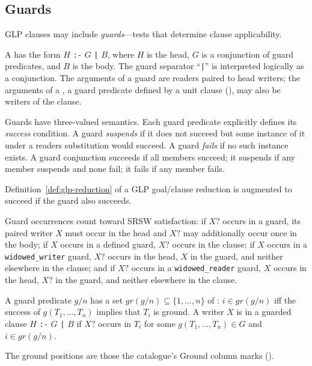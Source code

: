 \subsection{Guards}
\label{sec:guards}

GLP clauses may include \emph{guards}---tests that determine clause applicability.

\begin{definition}
\label{def:guarded-clause}
A  has the form $H$ \verb|:-| $G$ \verb"|" $B$, where $H$ is the head, $G$ is a conjunction of guard predicates, and $B$ is the body. The guard separator ``\verb"|"'' is interpreted logically as a conjunction.  The arguments of a guard are readers paired to head writers; the arguments of a , a guard predicate defined by a unit clause (), may also be writers of the clause.
\end{definition}

Guards have three-valued semantics. Each guard predicate explicitly defines its \emph{success} condition. A guard \emph{suspends} if it does not succeed but some instance of it under a readers substitution would succeed. A guard \emph{fails} if no such instance exists. A guard conjunction succeeds if all members succeed; it suspends if any member suspends and none fail; it fails if any member fails.

Definition~\ref{def:glp-reduction} of a GLP goal/clause reduction is augmented to succeed if the guard also succeeds.

\begin{remark}
\label{rem:guards-srsw}
Guard occurrences count toward SRSW satisfaction: if $X?$ occurs in a guard, its paired writer $X$ must occur in the head and $X?$ may additionally occur once in the body; if $X$ occurs in a defined guard, $X?$ occurs in the clause; if $X$ occurs in a \verb|widowed_writer| guard, $X?$ occurs in the head, $X$ in the guard, and neither elsewhere in the clause; and if $X?$ occurs in a \verb|widowed_reader| guard, $X$ occurs in the head, $X?$ in the guard, and neither elsewhere in the clause.
\end{remark}

\begin{definition}
\label{def:ground-guarded}
A guard predicate $g/n$ has a set $\mathit{gr}(g/n) \subseteq \{1,\ldots,n\}$ of : $i \in \mathit{gr}(g/n)$ iff the success of $g(T_1,\ldots,T_n)$ implies that $T_i$ is ground. A writer $X$ is  in a guarded clause $H$ \verb|:-| $G$ \verb"|" $B$ if $X?$ occurs in $T_i$ for some $g(T_1,\ldots,T_n) \in G$ and $i \in \mathit{gr}(g/n)$.
\end{definition}
The ground positions are those the catalogue's Ground column marks ().

